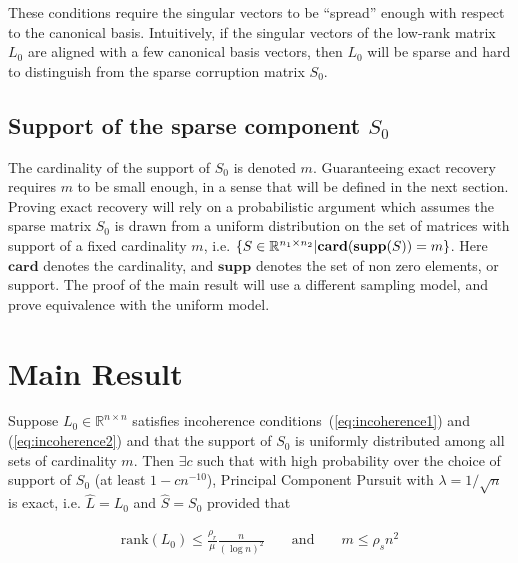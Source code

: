 These conditions require the singular vectors to be ``spread'' enough with respect to the canonical basis. Intuitively, if the singular vectors of the low-rank matrix $L_0$ are aligned with a few canonical basis vectors, then $L_0$ will be sparse and hard to distinguish from the sparse corruption matrix $S_0$.



\subsection{Support of the sparse component $S_0$}
The cardinality of the support of $S_0$ is denoted $m$. Guaranteeing exact recovery requires $m$ to be small enough, in a sense that will be defined in the next section. Proving exact recovery will rely on a probabilistic argument which assumes the sparse matrix $S_0$ is drawn from a uniform distribution on the set of matrices with support of a fixed cardinality $m$, i.e. $\{ S \in {\mathbb R}^{n_1 \times n_2} | \mathbf{card}(\mathbf{supp}(S)) = m \}$. Here $\mathbf{card}$ denotes the cardinality, and $\mathbf{supp}$ denotes the set of non zero elements, or support. The proof of the main result will use a different sampling model, and prove equivalence with the uniform model.


\section{Main Result}
\begin{theorem}
\label{thm:pcp}
Suppose $L_0 \in \mathbb{R}^{n \times n}$ satisfies incoherence conditions~(\ref{eq:incoherence1}) and (\ref{eq:incoherence2}) and that the support of $S_0$ is uniformly distributed among all sets of cardinality $m$. Then $\exists c$ such that with high probability over the choice of support of $S_0$ (at least $1-cn^{-10}$), Principal Component Pursuit with $\lambda = 1/\sqrt{n}$ is exact, i.e. $\hat{L} = L_0$ and $\hat{S} = S_0$ provided that

\begin{equation}
\begin{aligned}
\text{rank}(L_0) \leq \frac{\rho_r}{\mu} \frac{n}{(\log n)^2} && \text{ and } && m \leq \rho_s n^2
\end{aligned}
\end{equation}

\end{theorem}

